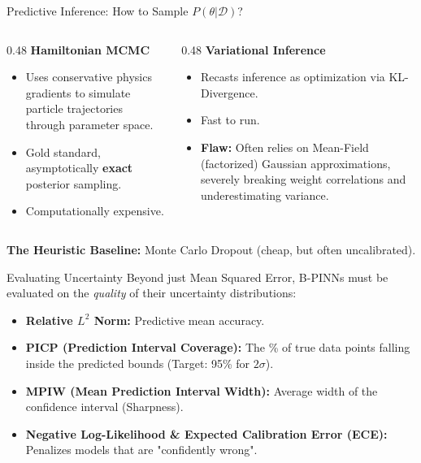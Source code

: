 \documentclass{beamer}
\begin{document}
\begin{frame}{Predictive Inference: How to Sample $P(\theta|\mathcal{D})$?}
    \begin{columns}
        \begin{column}{0.48\textwidth}
            \textbf{Hamiltonian MCMC}
            \begin{itemize}
                \item Uses conservative physics gradients to simulate particle trajectories through parameter space.
                \item Gold standard, asymptotically \textbf{exact} posterior sampling.
                \item Computationally expensive.
            \end{itemize}
        \end{column}
        \begin{column}{0.48\textwidth}
            \textbf{Variational Inference}
            \begin{itemize}
                \item Recasts inference as optimization via KL-Divergence.
                \item Fast to run.
                \item \textbf{Flaw:} Often relies on Mean-Field (factorized) Gaussian approximations, severely breaking weight correlations and underestimating variance.
            \end{itemize}
        \end{column}
    \end{columns}
    
    \vspace{0.3cm}
    \textbf{The Heuristic Baseline:} Monte Carlo Dropout (cheap, but often uncalibrated).
\end{frame}

\begin{frame}{Evaluating Uncertainty}
    Beyond just Mean Squared Error, B-PINNs must be evaluated on the \emph{quality} of their uncertainty distributions:
    \vspace{0.3cm}
    \begin{itemize}
        \item \textbf{Relative $L^2$ Norm:} Predictive mean accuracy.
        \item \textbf{PICP (Prediction Interval Coverage):} The \% of true data points falling inside the predicted bounds (Target: 95\% for $2\sigma$).
        \item \textbf{MPIW (Mean Prediction Interval Width):} Average width of the confidence interval (Sharpness).
        \item \textbf{Negative Log-Likelihood \& Expected Calibration Error (ECE):} Penalizes models that are "confidently wrong".
    \end{itemize}
\end{frame}
\end{document}
